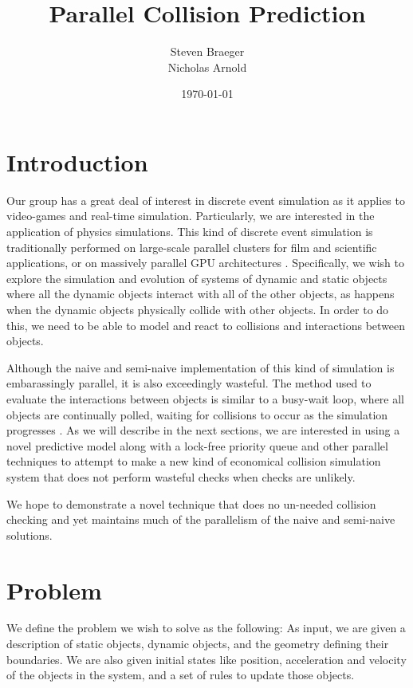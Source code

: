 \documentclass{article}
\begin{document}
\title{Parallel Collision Prediction}
\author{Steven Braeger\\
	Nicholas Arnold}  
\date{\today}
\maketitle

\section*{Introduction}
Our group has a great deal of interest in discrete event simulation as it applies to video-games and real-time simulation.
Particularly, we are interested in the application of physics simulations.  This kind of discrete event simulation is traditionally performed on large-scale parallel clusters for film and scientific applications, or on massively parallel GPU architectures \cite{grape,uberflow}.  Specifically, we wish to explore the simulation and evolution of systems of dynamic and static objects where all the dynamic objects interact with all of the other objects, as happens when the dynamic objects physically collide with other objects.  In order to do this, we need to be able to model and react to collisions and interactions between objects. 

Although the naive and semi-naive implementation of this kind of simulation is embarassingly parallel, it is also exceedingly wasteful.  The method used to evaluate the interactions between objects is similar to a busy-wait loop, where all objects are continually polled, waiting for collisions to occur as the simulation progresses \cite{nbodycollisions,Moore88collisiondetection}.   As we will describe in the next sections, we are interested in using a novel predictive model along with a lock-free priority queue and other parallel techniques to attempt to make a new kind of economical collision simulation system that does not perform wasteful checks when checks are unlikely.

We hope to demonstrate a novel technique that does no un-needed collision checking and yet maintains much of the parallelism of the naive and semi-naive solutions.

\section*{Problem}
We define the problem we wish to solve as the following:
As input, we are given a description of static objects, dynamic objects, and the geometry defining their boundaries.  We are 
also given initial states like position, acceleration and velocity of the objects in the system, and a set of rules to update those objects.  
\end{document}
